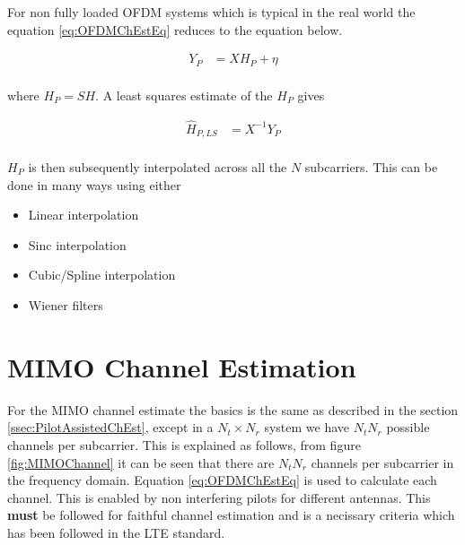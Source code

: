 For non fully loaded OFDM systems which is typical in the real world the equation \ref{eq:OFDMChEstEq} reduces to the equation below.

\begin{equation}\label{eq:ReducedRankOFDMChEstEq}
    \begin{aligned}
        Y_P & = XH_P + \eta \\
    \end{aligned}
\end{equation}

{where } $H_P = SH$. A least squares estimate of the $H_P$ gives 

\begin{equation}\label{eq:ReducedRankOFDMChEstEq}
    \begin{aligned}
        \hat{H}_{P,LS} & = X^{-1}Y_P \\
    \end{aligned}
\end{equation}

$H_P$ is then subsequently interpolated across all the $N$ subcarriers. This can be done in many ways using either
\begin{itemize}
    \item Linear interpolation
    \item Sinc interpolation
    \item Cubic/Spline interpolation
    \item Wiener filters
\end{itemize}

\section{MIMO Channel Estimation}\label{sec:MIMO}

For the MIMO channel estimate the basics is the same as described in the section \ref{ssec:PilotAssistedChEst}, except in a $N_t{\times}N_r$ system we have $N_tN_r$ possible channels per subcarrier. This is explained as follows, from figure \ref{fig:MIMOChannel} it can be seen that there are $N_tN_r$ channels per subcarrier in the frequency domain. Equation \ref{eq:OFDMChEstEq} is used to calculate each channel. This is enabled by non interfering pilots for different antennas. This \textbf{must} be followed for faithful channel estimation and is a necissary criteria which has been followed in the LTE standard.

